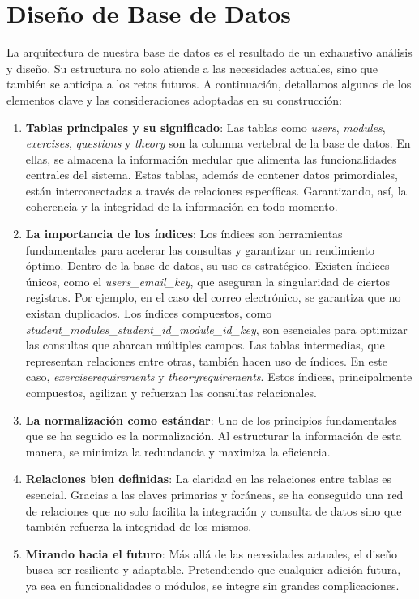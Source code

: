 \section{Diseño de Base de Datos}

La arquitectura de nuestra base de datos es el resultado de un exhaustivo análisis y diseño. Su estructura no solo atiende a las necesidades actuales, sino que también se anticipa a los retos futuros. A continuación, detallamos algunos de los elementos clave y las consideraciones adoptadas en su construcción:

\begin{enumerate}
    \item \textbf{Tablas principales y su significado}: Las tablas como \textit{users}, \textit{modules}, \textit{exercises}, \textit{questions} y \textit{theory} son la columna vertebral de la base de datos. En ellas, se almacena la información medular que alimenta las funcionalidades centrales del sistema. Estas tablas, además de contener datos primordiales, están interconectadas a través de relaciones específicas. Garantizando, así, la coherencia y la integridad de la información en todo momento.
    
    \item  \textbf{La importancia de los índices}: Los índices son herramientas fundamentales para acelerar las consultas y garantizar un rendimiento óptimo. Dentro de la base de datos, su uso es estratégico. Existen índices únicos, como el \textit{users\_email\_key}, que aseguran la singularidad de ciertos registros. Por ejemplo, en el caso del correo electrónico, se garantiza que no existan duplicados. Los índices compuestos, como \textit{student\_modules\_student\_id\_module\_id\_key}, son esenciales para optimizar las consultas que abarcan múltiples campos. Las tablas intermedias, que representan relaciones entre otras, también hacen uso de índices. En este caso, \textit{exerciserequirements} y \textit{theoryrequirements}. Estos índices, principalmente compuestos, agilizan y refuerzan las consultas relacionales.

    \item \textbf{La normalización como estándar}: Uno de los principios fundamentales que se ha seguido es la normalización. Al estructurar la información de esta manera, se minimiza la redundancia y maximiza la eficiencia.

    \item \textbf{Relaciones bien definidas}: La claridad en las relaciones entre tablas es esencial. Gracias a las claves primarias y foráneas, se ha conseguido una red de relaciones que no solo facilita la integración y consulta de datos sino que también refuerza la integridad de los mismos.

    \item \textbf{Mirando hacia el futuro}: Más allá de las necesidades actuales, el diseño busca ser resiliente y adaptable. Pretendiendo que cualquier adición futura, ya sea en funcionalidades o módulos, se integre sin grandes complicaciones.
\end {enumerate}


